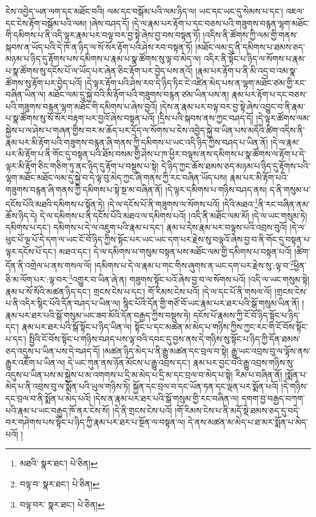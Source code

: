 ངེས་འབྱེད་ཡན་ལག་དང་མཐོང་བའི། ལམ་དང་བསྒོམ་པའི་ལམ་ཉིད་ལ། ཡང་དང་ཡང་དུ་སེམས་པ་དང་། འཇལ་དང་ངེས་རྟོག་བསྒོམ་པའི་ལམ། །ཞེས་བཤད་དོ། །དེ་ལ་རྣམ་པར་རྟོག་པ་དང་བཅས་པའི་གཟུགས་བརྙན་ལྷག་མཐོང་གི་དམིགས་པ་ནི་འདི་ལྟར་རྣམ་པར་བལྟ་བར་བྱ་སྟེ་ཞེས་བྱ་བས་བསྟན་ཏོ། །འདིས་ནི་ཚོགས་ཀྱི་ལམ་གྱི་གནས་སྐབས་ན་ཡོད་པའི་དེ་ཁོ་ན་ཉིད་ལ་སོ་སོར་རྟོག་པའི་ཤེས་རབ་བསྟན་ཏོ། །མཐོང་ལམ་དུ་ནི་དམིགས་པ་ཐམས་ཅད་མཉམ་པ་ཉིད་དུ་རྟོགས་པས་དམིགས་པ་རྣམ་པ་སྣ་ཚོགས་སུ་ལྟ་བ་མེད་ལ། འདིར་ནི་སྟོང་པ་ཉིད་ལ་སོགས་པ་རྣམ་པ་སྣ་ཚོགས་སུ་དངོས་པོ་ལ་ཡོད་པར་ཞེན་ཅིང་རྟོག་པར་བྱེད་པས་ནའོ། །རྣམ་པར་རྟོག་པ་ནི་མི་འདྲ་བ་འམ་སྣ་ཚོགས་སུ་རྟོག་པར་བྱེད་པའོ། །དེ་ལྟར་རྟོག་པའི་ཤེས་རབ་དེ་ཉིད་ཏིང་ངེ་འཛིན་མེད་པས་ན་ལྷག་མཐོང་ཙམ་གྱི་རང་བཞིན་ཡིན་ལ། མཐོང་ལམ་དུ་སྐྱེ་བའི་མི་རྟོག་པའི་གཟུགས་བརྙན་ཙམ་ཡིན་པས་ན། རྣམ་པར་རྟོག་པ་དང་བཅས་པའི་གཟུགས་བརྙན་ལྷག་མཐོང་གི་དམིགས་པ་ཞེས་བྱའོ། །དེས་ན་རྣམ་པར་བལྟ་བར་བྱ་སྟེ་ཞེས་འབྱུང་བ་ནི་རྣམ་པ་སྣ་ཚོགས་སུ་སོ་སོར་བརྟག་པར་བྱའོ་ཞེས་བསྟན་པའོ། །དྲིས་པའི་སྐབས་ནས་ཀྱང་བཤད་དོ། །དེ་ལྟར་ཚོགས་ལམ་སྐྱེས་པ་ལ་ཤེས་པ་གཞན་གྱིས་བར་མ་ཆོད་པར་དྲོད་ལ་སོགས་པ་ངེས་འབྱེད་སྐྱེ་བ་ཡིན་པས་མདོའི་ཚིག་འདིས་ནི་རྣམ་པར་མི་རྟོག་པའི་གཟུགས་བརྙན་ཞི་གནས་ཀྱི་དམིགས་པ་ཡང་འདི་ཉིད་ཀྱིས་བཤད་པ་ཡིན་ནོ། །དེ་ལ་རྣམ་པར་མི་རྟོག་པ་ནི་གོང་དུ་བསྟན་པའི་ཐོས་བསམ་གྱི་ཤེས་པ་ཁ་ཕྱིར་བལྟས་ནས་དམིགས་པ་སྣ་ཚོགས་ལ་རྟོག་པ་དེ་ལྟར་མི་རྟོག་ཅིང་གཅིག་ཏུ་ནང་ཉིད་དུ་རྟོག་པ་བསྡུས་པ་སྟེ། དེ་ཉིད་ཀྱང་ཆོས་ཐམས་ཅད་མཉམ་པ་ཉིད་དུ་རྟོགས་པའི་ལྷག་མཐོང་མཐོང་ལམ་དུ་སྐྱེ་བ་དེ་ལྟ་བུ་མེད་ཀྱང་ཞི་གནས་ཀྱི་རང་བཞིན་ཡོད་པས། རྣམ་པར་མི་རྟོག་པའི་གཟུགས་བརྙན་ཞི་གནས་ཀྱི་དམིགས་པ་སྟེ་སྔ་མ་བཞིན་ནོ། །དེ་ལྟར་དམིགས་པ་གཉིས་བཤད་ནས། ད་ནི་གསུམ་པ་དངོས་པོའི་མཐའི་དམིགས་པ་སྟོན་ཏེ། །དེ་ལ་དངོས་པོ་ནི་གཟུགས་ལ་སོགས་པའོ། །དེའི་མཐའ་\footnote{མཐའི་  སྣར་ཐང་།  པེ་ཅིན། }ནི་རང་བཞིན་ནམ་ཆོས་ཉིད་དེ། དེ་ལ་དམིགས་པ་ནི་དངོས་པོའི་མཐའ་ལ་དམིགས་པའོ། །འདི་ནི་མཐོང་ལམ་མོ། །དེ་ལ་ཡང་གསུམ་ཏེ། དམིགས་པ་དང་། དམིགས་པ་དེ་ལ་འཇུག་པའི་རྣམ་པ་དང་། རྣམ་པ་དེས་རྣམ་པར་བལྟས་པའི་འབྲས་བུའོ། །དེ་ལ་ཕུང་པོ་ལྔ་པོ་དེ་དག་ལ་ཡང་ངོ་བོ་ཉིད་ཀྱིས་སྟོང་པར་ཡང་ཡང་དག་པར་རྗེས་སུ་བལྟའོ་ཞེས་བྱ་བ་ནི་གོང་དུ་བསྟན་པ་ལྟར་དངོས་པོ་དང་། མཐའ་དང་། དེ་ལ་དམིགས་པ་གསུམ་བསྟན་པས་མཐོང་ལམ་གྱི་དམིགས་པ་བསྟན་པའོ། །ཚིག་དོན་ནི་འགྲེལ་པ་ནས་གསལ་ལོ། །དམིགས་པ་དེ་ལ་རྣམ་པ་གང་གིས་ཞུགས་ན་ཡང་དག་པར་རྗེས་སུ་:ལྟ་བ་\footnote{བལྟ་བ་  སྣར་ཐང་།  པེ་ཅིན། }ཕྱིན་ཅི་མ་ལོག་པར་:ལྟ་བར་\footnote{བལྟ་བར་  སྣར་ཐང་།  པེ་ཅིན། }འགྱུར་བ་ཡིན་ཞེ་ན། གཟུགས་སྟོང་པའོ་ཞེས་བྱ་བ་ལ་སོགས་པའོ། །འདི་ལ་ཡང་གསུམ་སྟེ། རྣམ་པ་སོ་སོའི་མཚན་ཉིད་དང་། གྲངས་ངེས་པ་དང་། གོ་རིམས་ངེས་པའོ། །དེ་ལ་དང་པོ་ནི་གསལ་ལོ། །གྲངས་ངེས་པ་ནི་འདིར་སྙིང་པོའི་དོན་བཤད་པ་ཡིན་ལ། སྙིང་པོའི་དོན་གྱི་གཙོ་བོ་ཡང་རྣམ་པར་ཐར་པའི་སྒོ་གསུམ་ཡིན་ནོ། །རྣམ་པར་ཐར་པའི་སྒོ་གསུམ་ཡང་ཟབ་མོའི་དོན་བརྒྱད་ཀྱིས་བསྡུས་ཏེ། དངོས་པོ་རྣམས་ཀྱི་ངོ་བོ་ཉིད་སྟོང་པ་ཉིད་དང་། རྣམ་པར་ཐར་པའི་སྒོ་སྟོང་པ་ཉིད་ཡིན་ལ། སྟོང་པ་དང་མཚན་མ་མེད་པ་གཉིས་ཀྱིས་ཀྱང་རང་གི་ངོ་བོས་སྟོང་པ་དང་། སྤྱིའི་ངོ་བོས་སྟོང་པ་གཉིས་བཤད་པས་ལྟ་བའི་དབང་དུ་བྱས་ནས་དེ་གཉིས་སུ་སྟོང་པ་ཉིད་ཀྱི་དོན་ཐམས་ཅད་འདུས་པ་ཡིན་པས་དེ་བཤད་དོ། །མཚན་ཉིད་མེད་པ་ནི་རྒྱུ་མཚན་དང་བྲལ་བ་སྟེ། རྒྱུ་ཡང་འབྲས་བུ་ལ་ལྟོས་ནས་རྒྱུར་འཇོག་པ་ཡིན་ལ། དེ་ཡང་ཀུན་ནས་ཉོན་མོངས་པ་རྒྱུ་འབྲས་དང་། རྣམ་པར་བྱང་བའི་རྒྱུ་འབྲས་གཉིས་སུ་འདུས་པ་ཡིན་པས་མ་སྐྱེས་པ་མ་འགགས་པ་དྲི་མ་མེད་པ་དྲི་མ་དང་བྲལ་བ་མེད་པ་སྟེ། རིམ་པ་བཞིན་ནོ། །སྨོན་པ་མེད་པ་ནི་འབྲས་བུ་ལ་སྨོན་པའི་ཡུལ་གཉིས་ཏེ། སྐྱོན་དང་བྲལ་བ་དང་ཡོན་ཏན་དང་ལྡན་པར་སྨོན་པའོ། །དེ་གཉིས་དང་བྲལ་བ་ནི་སྨོན་པ་མེད་པའོ། །དེས་ན་རྣམ་པར་ཐར་པའི་སྒོ་གསུམ་གྱི་རང་བཞིན་ལ། དགག་བྱ་བརྒྱད་བཀག་པའི་རྣམ་པ་ཡང་བརྒྱད་ཁོ་ནར་ངེས་སོ། །དེ་ནི་གྲངས་ངེས་པའོ། །གོ་རིམས་ངེས་པ་ནི་མདོ་སྡེ་ཐམས་ཅད་དུ་བདེ་བར་གཤེགས་པས་སྟོང་པ་ཉིད་ཀྱི་རྣམ་པར་ཐར་པ་སྔོན་ལ་བསྟན་ལ། དེ་ནས་མཚན་མ་མེད་པ་ཐ་མར་སྨོན་པ་མེད་པའོ། །
